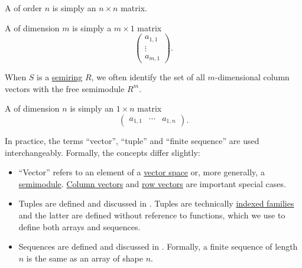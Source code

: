 \begin{definition}
\begin{thmenum}
     A  of order \( n \) is simply an \( n \times n \) matrix.

     A  of dimension \( m \) is simply a \( m \times 1 \) matrix
    \begin{equation*}
      \begin{pmatrix}
        a_{1,1} \\
        \vdots  \\
        a_{m,1}
      \end{pmatrix}.
    \end{equation*}

    When \( S \) is a \hyperref[def:semiring]{semiring} \( R \), we often identify the set of all \( m \)-dimensional column vectors with the free semimodule \hyperref[def:standard_basis]{\( R^m \)}.

     A  of dimension \( n \) is simply an \( 1 \times n \) matrix
    \begin{equation*}
      \begin{pmatrix}
        a_{1,1} & \cdots & a_{1,n}
      \end{pmatrix}.
    \end{equation*}
  \end{thmenum}
\end{definition}

\begin{remark}\label{rem:vector_etymology}
  In practice, the terms \enquote{vector}, \enquote{tuple} and \enquote{finite sequence} are used interchangeably. Formally, the concepts differ slightly:

  \begin{itemize}
    \item \enquote{Vector} refers to an element of a \hyperref[def:vector_space]{vector space} or, more generally, a \hyperref[def:semimodule]{semimodule}. \hyperref[def:array/column_vector]{Column vectors} and \hyperref[def:array/row_vector]{row vectors} are important special cases.

    \item Tuples are defined and discussed in . Tuples are technically \hyperref[def:cartesian_product/indexed_family]{indexed families} and the latter are defined without reference to functions, which we use to define both arrays and sequences.

    \item Sequences are defined and discussed in . Formally, a finite sequence of length \( n \) is the same as an array of shape \( n \).
  \end{itemize}
\end{remark}

